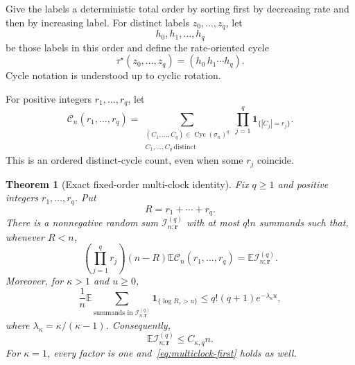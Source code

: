 \documentclass[11pt]{article}
\newtheorem{theorem}{Theorem}[section]
\theoremstyle{remark}
\newcommand{\Ee}{\mathbb E}
\newcommand{\one}{\mathbf 1}
\newcommand{\Cyc}{\operatorname{Cyc}}
\begin{document}
Give the labels a deterministic total order by sorting first by decreasing
rate and then by increasing label.  For distinct labels
$z_0,\ldots,z_q$, let
\[
 h_0,h_1,\ldots,h_q
\]
be those labels in this order and define the rate-oriented cycle
\begin{equation}
\label{eq:tau-star-q}
 \tau^\star(z_0,\ldots,z_q)=(h_0\,h_1\cdots h_q).
\end{equation}
Cycle notation is understood up to cyclic rotation.

For positive integers $r_1,\ldots,r_q$, let
\begin{equation}
\label{eq:Cq}
 \mathcal C_n(r_1,\ldots,r_q)
 =\sum_{\substack{(C_1,\ldots,C_q)\in\Cyc(\sigma_n)^q\\
                   C_1,\ldots,C_q\ \mathrm{distinct}}}
 \prod_{j=1}^q\one_{\{|C_j|=r_j\}}.
\end{equation}
This is an ordered distinct-cycle count, even when some $r_j$ coincide.

\begin{theorem}[Exact fixed-order multi-clock identity]
\label{thm:multiclock}
Fix $q\ge1$ and positive integers $r_1,\ldots,r_q$.  Put
\[
 R=r_1+\cdots+r_q.
\]
There is a nonnegative random sum $\mathcal I_{n;\mathbf r}^{(q)}$ with at
most $q!n$ summands such that, whenever $R<n$,
\begin{equation}
\label{eq:multiclock-identity}
 \left(\prod_{j=1}^q r_j\right)(n-R)
 \Ee\mathcal C_n(r_1,\ldots,r_q)
 =\Ee\mathcal I_{n;\mathbf r}^{(q)}.
\end{equation}
Moreover, for $\kappa>1$ and $u\ge0$,
\begin{equation}
\label{eq:multiclock-tail}
 \frac1n\Ee
 \sum_{\text{summands in }\mathcal I_{n;\mathbf r}^{(q)}}
 \one_{\{\log R_\tau>u\}}
 \le q!(q+1)e^{-\lambda_\kappa u},
\end{equation}
where $\lambda_\kappa=\kappa/(\kappa-1)$.  Consequently,
\begin{equation}
\label{eq:multiclock-first}
 \Ee\mathcal I_{n;\mathbf r}^{(q)}\le C_{\kappa,q}n.
\end{equation}
For $\kappa=1$, every factor is one and~\eqref{eq:multiclock-first}
holds as well.
\end{theorem}
\end{document}
